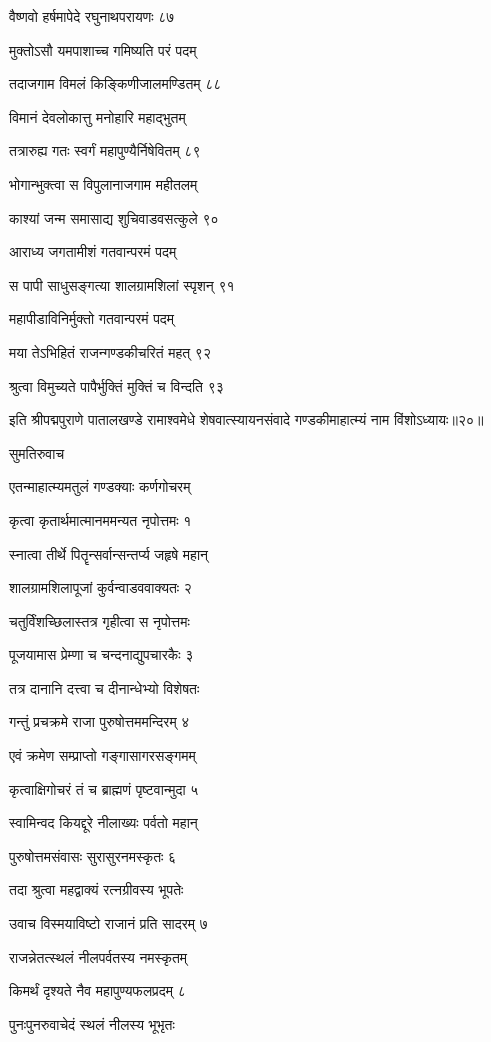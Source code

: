 वैष्णवो हर्षमापेदे रघुनाथपरायणः ८७

मुक्तोऽसौ यमपाशाच्च गमिष्यति परं पदम्

तदाजगाम विमलं किङ्किणीजालमण्डितम् ८८

विमानं देवलोकात्तु मनोहारि महाद्भुतम्

तत्रारुह्य गतः स्वर्गं महापुण्यैर्निषेवितम् ८९

भोगान्भुक्त्वा स विपुलानाजगाम महीतलम्

काश्यां जन्म समासाद्य शुचिवाडवसत्कुले ९०

आराध्य जगतामीशं गतवान्परमं पदम्

स पापी साधुसङ्गत्या शालग्रामशिलां स्पृशन् ९१

महापीडाविनिर्मुक्तो गतवान्परमं पदम्

मया तेऽभिहितं राजन्गण्डकीचरितं महत् ९२

श्रुत्वा विमुच्यते पापैर्भुक्तिं मुक्तिं च विन्दति ९३

इति श्रीपद्मपुराणे पातालखण्डे रामाश्वमेधे शेषवात्स्यायनसंवादे गण्डकीमाहात्म्यं नाम विंशोऽध्यायः॥२०॥


सुमतिरुवाच

एतन्माहात्म्यमतुलं गण्डक्याः कर्णगोचरम्

कृत्वा कृतार्थमात्मानममन्यत नृपोत्तमः १

स्नात्वा तीर्थे पितॄन्सर्वान्सन्तर्प्य जहृषे महान्

शालग्रामशिलापूजां कुर्वन्वाडववाक्यतः २

चतुर्विंशच्छिलास्तत्र गृहीत्वा स नृपोत्तमः

पूजयामास प्रेम्णा च चन्दनाद्युपचारकैः ३

तत्र दानानि दत्त्वा च दीनान्धेभ्यो विशेषतः

गन्तुं प्रचक्रमे राजा पुरुषोत्तममन्दिरम् ४

एवं क्रमेण सम्प्राप्तो गङ्गासागरसङ्गमम्

कृत्वाक्षिगोचरं तं च ब्राह्मणं पृष्टवान्मुदा ५

स्वामिन्वद कियद्दूरे नीलाख्यः पर्वतो महान्

पुरुषोत्तमसंवासः सुरासुरनमस्कृतः ६

तदा श्रुत्वा महद्वाक्यं रत्नग्रीवस्य भूपतेः

उवाच विस्मयाविष्टो राजानं प्रति सादरम् ७

राजन्नेतत्स्थलं नीलपर्वतस्य नमस्कृतम्

किमर्थं दृश्यते नैव महापुण्यफलप्रदम् ८

पुनःपुनरुवाचेदं स्थलं नीलस्य भूभृतः

